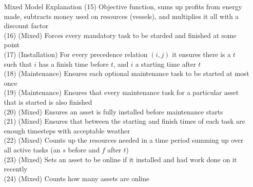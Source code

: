 \documentclass{beamer}
\begin{document}
\begin{frame}{Mixed Model Explanation}
\footnotesize
(15) Objective function, sums up profits from energy made, subtracts money used on resources (vessels), and multiplies it all with a discount factor	\\
(16) (Mixed) Forces every mandatory task to be starded and finished at some point	\\
(17) (Installation) For every precedence relation $(i, j)$ it ensures there is a $t$ such that $i$ has a finish time before $t$, and $i$ a starting time after $t$	\\
(18) (Maintenance) Ensures each optional maintenance task to be started at most once 	\\
(19) (Maintenance)	Ensures that every maintenance task for a particular asset that is started is also finished \\
(20) (Mixed) Ensures an asset is fully installed before maintenance starts	\\
(21) (Mixed) Ensures that between the starting and finish times of each task are enough timesteps with acceptable weather	\\
(22) (Mixed) Counts up the resources needed in a time period summing up over all active tasks (an $s$ before and $f$ after $t$)	\\
(23) (Mixed) Sets an asset to be online if it installed and had work done on it recently \\
(24) (Mixed) Counts how many assets are online	
\end{frame}
\end{document}
